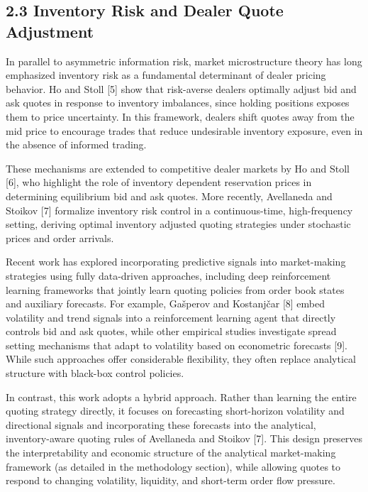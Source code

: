 \documentclass[12pt,a4paper]{article}
\begin{document}
\subsection{2.3 Inventory Risk and Dealer Quote
Adjustment}\label{inventory-risk-and-dealer-quote-adjustment}

In parallel to asymmetric information risk, market microstructure theory
has long emphasized inventory risk as a fundamental determinant of
dealer pricing behavior. Ho and Stoll {[}5{]} show that risk-averse
dealers optimally adjust bid and ask quotes in response to inventory
imbalances, since holding positions exposes them to price uncertainty.
In this framework, dealers shift quotes away from the mid price to
encourage trades that reduce undesirable inventory exposure, even in the
absence of informed trading.

These mechanisms are extended to competitive dealer markets by Ho and
Stoll {[}6{]}, who highlight the role of inventory dependent reservation
prices in determining equilibrium bid and ask quotes. More recently,
Avellaneda and Stoikov {[}7{]} formalize inventory risk control in a
continuous-time, high-frequency setting, deriving optimal inventory
adjusted quoting strategies under stochastic prices and order arrivals.

Recent work has explored incorporating predictive signals into
market-making strategies using fully data-driven approaches, including
deep reinforcement learning frameworks that jointly learn quoting
policies from order book states and auxiliary forecasts. For example,
Gašperov and Kostanjčar {[}8{]} embed volatility and trend signals into
a reinforcement learning agent that directly controls bid and ask
quotes, while other empirical studies investigate spread setting
mechanisms that adapt to volatility based on econometric forecasts
{[}9{]}. While such approaches offer considerable flexibility, they
often replace analytical structure with black-box control policies.

In contrast, this work adopts a hybrid approach. Rather than learning
the entire quoting strategy directly, it focuses on forecasting
short-horizon volatility and directional signals and incorporating these
forecasts into the analytical, inventory-aware quoting rules of
Avellaneda and Stoikov {[}7{]}. This design preserves the
interpretability and economic structure of the analytical market-making
framework (as detailed in the methodology section), while allowing
quotes to respond to changing volatility, liquidity, and short-term
order flow pressure.
\end{document}
